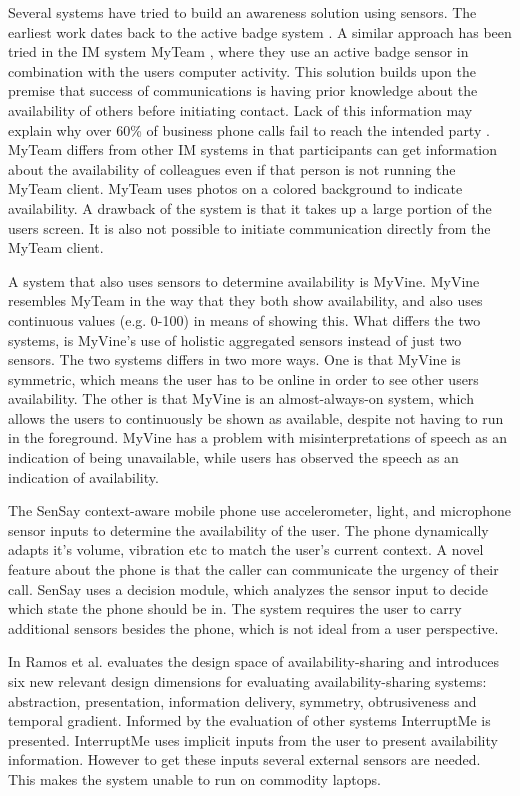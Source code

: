\documentclass{sigchi}
\begin{document}
Several systems have tried to build an awareness solution using sensors.
The earliest work dates back to the active badge system \cite{want1992active}.
A similar approach has been tried in the IM system MyTeam \cite{lai2003myteam}, where they use an active badge sensor in combination with the users computer activity.
This solution builds upon the premise that success of communications is having prior knowledge about the availability of others before initiating contact.
Lack of this information may explain why over 60\% of business phone calls fail to reach the intended party \cite{whittaker1995rethinking}.
MyTeam differs from other IM systems in that participants can get information about the availability of colleagues even if that person is not running the MyTeam client.
MyTeam uses photos on a colored background to indicate availability.
A drawback of the system is that it takes up a large portion of the users screen. It is also not possible to initiate communication directly from the MyTeam client.

A system that also uses sensors to determine availability is MyVine.
MyVine resembles MyTeam in the way that they both show availability, and also uses continuous values (e.g. 0-100) in means of showing this.
What differs the two systems, is MyVine’s use of holistic aggregated sensors instead of just two sensors.
The two systems differs in two more ways.
One is that MyVine is symmetric, which means the user has to be online in order to see other users availability.
The other is that MyVine is an almost-always-on system, which allows the users to continuously be shown as available, despite not having to run in the foreground.
MyVine has a problem with misinterpretations of speech as an indication of being unavailable, while users has observed the speech as an indication of availability.

The SenSay context-aware mobile phone \cite{siewiorek2003sensay} use accelerometer, light, and microphone sensor inputs to determine the availability of the user.
The phone dynamically adapts it’s volume, vibration etc to match the user's current context.
A novel feature about the phone is that the caller can communicate the urgency of their call.
SenSay uses a decision module, which analyzes the sensor input to decide which state the phone should be in.
The system requires the user to carry additional sensors besides the phone, which is not ideal from a user perspective.

In \cite{hincapie2011design} Ramos et al. evaluates the design space of availability-sharing and introduces six new relevant design dimensions for evaluating availability-sharing systems: abstraction, presentation, information delivery, symmetry, obtrusiveness and temporal gradient.
Informed by the evaluation of other systems InterruptMe is presented.
InterruptMe uses implicit inputs from the user to present availability information.
However to get these inputs several external sensors are needed.
This makes the system unable to run on commodity laptops.
\end{document}
